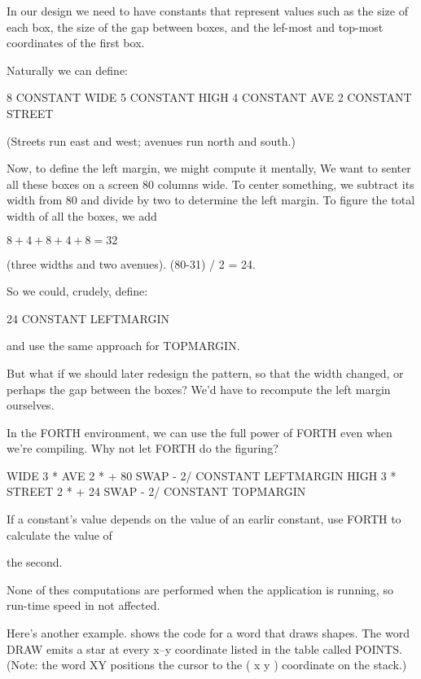 In our design we need to have constants that represent values such as the size of each box, the size of the gap between boxes, and the lef-most and top-most coordinates of the first box.

Naturally we can define:

\begin{Code}
8 CONSTANT WIDE
5 CONSTANT HIGH
4 CONSTANT AVE
2 CONSTANT STREET
\end{Code}
(Streets run east and west; avenues run north and south.)

Now, to define the left margin, we might compute it mentally, We want to senter all these boxes on a screen 80 columns wide. To center something, we subtract its width from 80 and divide by two to determine the left margin. To figure the total width of all the boxes, we add

\medskip

$8 + 4 + 8 + 4 + 8 = 32$

\medskip

\noindent
(three widths and two avenues). (80-31) / 2 = 24.

So we could, crudely, define:

\begin{Code}
24 CONSTANT LEFTMARGIN
\end{Code}
and use the same approach for TOPMARGIN.

But what if we should later redesign the pattern, so that the width changed, or perhaps the gap between the boxes? We'd have to recompute the left margin ourselves.

In the FORTH environment, we can use the full power of FORTH even when we're compiling. Why not let FORTH do the figuring?

\begin{Code}
WIDE 3 *  AVE 2 *  +  80 SWAP -  2/ CONSTANT LEFTMARGIN
HIGH 3 *  STREET 2 * +  24 SWAP -  2/ CONSTANT TOPMARGIN
\end{Code}

\begin{tip}
If a constant's value depends on the value of an earlir constant, use FORTH to calculate the value of

the second.
\end{tip}
None of thes computations are performed when the application is running, so run-time speed in not affected.

Here's another example.  shows the code for a word that draws shapes. The word DRAW emits a star at every x--y coordinate listed in the table called POINTS. (Note: the word XY positions the cursor to the ( x y ) coordinate on the stack.)

